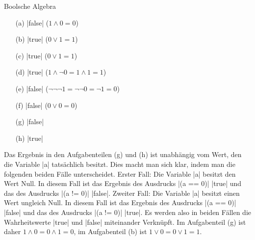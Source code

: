 \begin{exercise}{Boolsche Algebra}
\begin{solution}
\begin{center}
\begin{minipage}{0.49\textwidth}
\begin{itemize}
\item[(a)] \code|false| ($1 \wedge 0 = 0$)
\item[(b)] \code|true|   ($0 \vee 1 = 1$)
\item[(c)] \code|true|   ($0 \vee 1 = 1$)
\item[(d)] \code|true|   ($1 \wedge \neg 0 = 1 \wedge 1 = 1$)
\end{itemize}
\end{minipage}
\begin{minipage}{0.49\textwidth}
\begin{itemize}
\item[(e)] \code|false| ($\neg \neg \neg 1 = \neg \neg 0 = \neg 1 = 0$)
\item[(f)] \code|false| ($0 \vee 0 = 0$)
\item[(g)] \code|false|
\item[(h)] \code|true|
\end{itemize}
\end{minipage}
\end{center}
Das Ergebnis in den Aufgabenteilen (g) und (h) ist unabhängig vom Wert, den die Variable \code|a| tatsächlich besitzt. Dies macht man sich klar, indem man die folgenden beiden Fälle unterscheidet. Erster Fall: Die Variable \code|a| besitzt den Wert Null. In diesem Fall ist das Ergebnis des Ausdrucks \code|(a == 0)| \code|true| und das des Ausdrucks \code|(a != 0)| \code|false|. Zweiter Fall: Die Variable \code|a| besitzt einen Wert ungleich Null. In diesem Fall ist das Ergebnis des Ausdrucks \code|(a == 0)| \code|false| und das des Ausdrucks \code|(a != 0)| \code|true|. Es werden also in beiden Fällen die Wahrheitswerte \code|true| und \code|false| miteinander Verknüpft. Im Aufgabenteil (g) ist daher $1 \wedge 0 = 0 \wedge 1 = 0$, im Aufgabenteil (b) ist $1 \vee 0 = 0 \vee 1 = 1$.
\end{solution}

\end{exercise}
